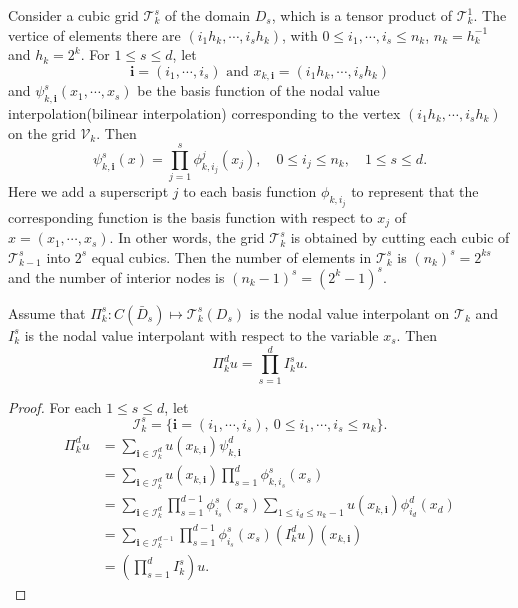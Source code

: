 Consider a cubic grid $
\mathcal{T}_k^s$ of the domain $D_s$, which is a tensor product of
$\mathcal{T}_k^1$. The vertice of elements there are $(i_1h_k, \cdots
, i_s h_k)$, with $0\leq i_1, \cdots, i_s\leq n_k$, $n_k=h_k^{-1}$
and $h_k=2^k$. For $1\leq s\leq d$, let
$$
\textbf{i}=(i_1,\cdots,i_s) \text{ and } x_{k,\textbf{i}}=(i_1h_k,\cdots, i_sh_k)
$$
and $\psi_{k, \textbf{i}}^s (x_1,\cdots,x_s)$ be the basis function of the nodal value interpolation(bilinear interpolation) corresponding to the vertex $(i_1h_k, \cdots , i_s h_k)$ on the grid $\mathcal{V}_k$. Then
\begin{equation}
\psi_{k, \textbf{i}}^s(x)=\prod_{j=1}^s\phi_{k,i_j}^j(x_j),
\quad 0\le i_j\le n_k,\quad 1\le s\le d.
\end{equation}
Here we add a superscript $j$ to each basis function $\phi_{k,i_j}$ to represent that the corresponding function is the basis function with respect to $x_j$ of $x=(x_1,\cdots,x_s)$. In other words, the grid $\mathcal{T}_k^s$ is obtained by cutting each cubic of $\mathcal{T}_{k-1}^s$ into $2^s$ equal cubics. Then the number of elements in $\mathcal{T}_k^s$ is $(n_k)^s=2^{ks}$ and the number of interior nodes is $(n_k-1)^s=(2^k-1)^s$.

\begin{lemma}
Assume that $\Pi_k^s: C(\bar D_s)\mapsto \mathcal{T}_k^s(D_s)$ is the nodal value interpolant on $\mathcal{T}_k$ and $I_k^s$ is the nodal value interpolant with respect to the variable $x_s$.  Then
$$\Pi_k^d u=\prod_{s=1}^d I^s_k u.$$
\end{lemma}
\begin{proof}
For each $1\leq s\leq d$, let
$$
\mathcal{I}_k^s=\{\textbf{i}=(i_1,\cdots,i_s),\ 0\leq i_1,\cdots ,i_s\leq n_k\}.
$$
\begin{equation}
\begin{split}
\Pi_k^d u&= \sum_{\textbf{i}\in \mathcal{I}_k^d} u(x_{k,\textbf{i}}) \psi_{k,\textbf{i}}^d\\
&= \sum_{\textbf{i}\in \mathcal{I}_k^d} u(x_{k,\textbf{i}})  \prod_{s=1}^d\phi_{k,i_s}^s(x_s)\\
&= \sum_{\textbf{i}\in \mathcal{I}_k^d}  \prod_{s=1}^{d-1}\phi_{i_s}^s(x_{s})\sum_{1\leq i_d\leq n_k-1} u(x_{k,\textbf{i}})\phi_{i_d}^d(x_d)\\
&=\sum_{\textbf{i}\in \mathcal{I}_k^{d-1}}  \prod_{s=1}^{d-1}\phi_{i_s}^s(x_{s})  (I_k^d u)(x_{k,\textbf{i}}) \\
&=(\prod_{s=1}^d I_k^s) u.
\end{split}
\end{equation}
\end{proof}


